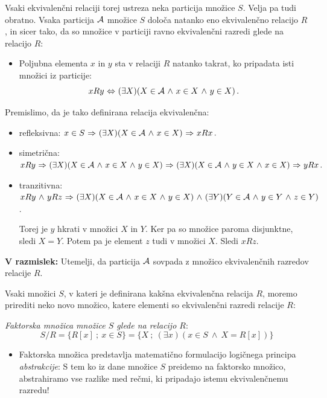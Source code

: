 \documentclass[11pt,paper=b5,DIV=13,headinclude,footinclude]{scrbook}
\def\inn {{~\wedge~}}
\def\sledi {{~\Rightarrow~}}
\def\cee {{~\Leftrightarrow~}}
\begin{document}
Vsaki ekvivalenčni relaciji torej ustreza neka particija množice $S$.
Velja pa tudi obratno. Vsaka particija ${\cal A}$ množice $S$ določa natanko eno ekvivalenčno relacijo $R$, in sicer tako, da so množice v particiji ravno ekvivalenčni razredi glede na relacijo $R$:
\begin{itemize}
  \item Poljubna elementa $x$ in $y$ sta v relaciji $R$ natanko takrat, ko pripadata isti množici iz particije:
      $$xRy\cee (\exists X)(X\in {\cal A}\inn x\in X\inn y\in X)\,.$$
\end{itemize}
Premislimo, da je tako definirana relacija ekvivalenčna:
\begin{itemize}
  \item refleksivna: $x\in S \sledi (\exists X)(X\in {\cal A}\inn x\in X)\sledi xRx\,.$
  \item simetrična:
  $xRy\sledi (\exists X)(X\in {\cal A}\inn x\in X\inn y\in X)
  \sledi (\exists X)(X\in {\cal A}\inn y\in X\inn x\in X)\sledi yRx\,.$
  \item tranzitivna:
  $xRy \inn yRz\sledi (\exists X)(X\in {\cal A}\inn x\in X\inn y\in X)
  \inn (\exists Y)(Y\in {\cal A}\inn y\in Y\inn z\in Y)$.

  Torej je $y$ hkrati v množici $X$ in $Y$. Ker pa so množice paroma disjunktne, sledi
  $X = Y$. Potem pa je element $z$ tudi v množici $X$. Sledi $xRz$.
\end{itemize}

\textbf{ V razmislek:} Utemelji, da particija ${\cal A}$ sovpada z množico ekvivalenčnih razredov relacije $R$.

%
%
%
%

%
%
%
%
%
%
%
%
\medskip



Vsaki množici $S$, v kateri je definirana kakšna ekvivalenčna relacija $R$, moremo prirediti neko novo množico, katere elementi so ekvivalenčni razredi relacije $R$:

{\em Faktorska množica množice $S$ glede na relacijo $R$}:
$$S/R = \{R[x]~;~x\in S\}=\{X~;~(\exists x)(x\in S \inn X = R[x])\}$$
\begin{itemize}
  \item Faktorska množica predstavlja matematično formulacijo logičnega principa {\em abstrakcije}: S tem ko iz dane množice $S$ preidemo na faktorsko množico, abstrahiramo vse razlike med rečmi, ki pripadajo istemu ekvivalenčnemu razredu!
\end{itemize}
\end{document}
